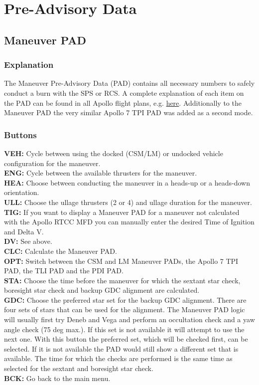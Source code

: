 \documentclass[11pt]{article} %
\begin{document}
\section{Pre-Advisory Data}
\subsection{Maneuver PAD}

\subsubsection{Explanation}

The Maneuver Pre-Advisory Data (PAD) contains all necessary numbers to safely conduct a burn with the SPS or RCS. A complete explanation of each item on the PAD can be found in all Apollo flight plans, e.g. \href{http://history.nasa.gov/alsj/a11/a11fltpln_final_reformat.pdf}{here}. Additionally to the Maneuver PAD the very similar Apollo 7 TPI PAD was added as a second mode.\\ 

\subsubsection{Buttons}

\textbf{VEH:} Cycle between using the docked (CSM/LM) or undocked vehicle configuration for the maneuver.\\
\textbf{ENG:} Cycle between the available thrusters for the maneuver.\\
\textbf{HEA:} Choose between conducting the maneuver in a heads-up or a heads-down orientation.\\
\textbf{ULL:} Choose the ullage thrusters (2 or 4) and ullage duration for the maneuver.\\
\textbf{TIG:} If you want to display a Maneuver PAD for a maneuver not calculated with the Apollo RTCC MFD you can manually enter the desired Time of Ignition and Delta V.\\
\textbf{DV:} See above.\\
\textbf{CLC:} Calculate the Maneuver PAD.\\
\textbf{OPT:} Switch between the CSM and LM Maneuver PADs, the Apollo 7 TPI PAD, the TLI PAD and the PDI PAD.\\
\textbf{STA:} Choose the time before the maneuver for which the sextant star check, boresight star check and backup GDC alignment are calculated.\\
\textbf{GDC:} Choose the preferred star set for the backup GDC alignment. There are four sets of stars that can be used for the alignment. The Maneuver PAD logic will usually first try Deneb and Vega and perform an occultation check and a yaw angle check (75 deg max.). If this set is not available it will attempt to use the next one. With this button the preferred set, which will be checked first, can be selected. If it is not available the PAD would still show a different set that is available. The time for which the checks are performed is the same time as selected for the sextant and boresight star check.\\
\textbf{BCK:} Go back to the main menu.\\
\newpage
\end{document}

